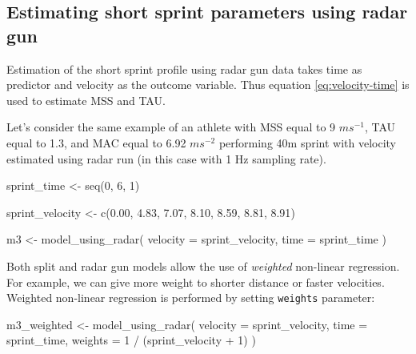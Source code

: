 \documentclass[fleqn,10pt]{wlpeerj} %
\newenvironment{Shaded}{\begin{snugshade}}{\end{snugshade}}
\newcommand{\AttributeTok}[1]{\textcolor[rgb]{0.77,0.63,0.00}{#1}}
\newcommand{\DecValTok}[1]{\textcolor[rgb]{0.00,0.00,0.81}{#1}}
\newcommand{\FloatTok}[1]{\textcolor[rgb]{0.00,0.00,0.81}{#1}}
\newcommand{\FunctionTok}[1]{\textcolor[rgb]{0.00,0.00,0.00}{#1}}
\newcommand{\NormalTok}[1]{#1}
\newcommand{\OtherTok}[1]{\textcolor[rgb]{0.56,0.35,0.01}{#1}}
\newcommand{\SpecialCharTok}[1]{\textcolor[rgb]{0.00,0.00,0.00}{#1}}
\begin{document}
\normalsize

\hypertarget{estimating-short-sprint-parameters-using-radar-gun}{%
\subsection{Estimating short sprint parameters using radar gun}\label{estimating-short-sprint-parameters-using-radar-gun}}

Estimation of the short sprint profile using radar gun data takes time as predictor and velocity as the outcome variable. Thus equation \eqref{eq:velocity-time} is used to estimate MSS and TAU.

Let's consider the same example of an athlete with MSS equal to 9 \(ms^{-1}\), TAU equal to 1.3, and MAC equal to 6.92 \(ms^{-2}\) performing 40m sprint with velocity estimated using radar run (in this case with 1 Hz sampling rate).

\small

\begin{Shaded}
\begin{Highlighting}[]
\NormalTok{sprint\_time }\OtherTok{\textless{}{-}} \FunctionTok{seq}\NormalTok{(}\DecValTok{0}\NormalTok{, }\DecValTok{6}\NormalTok{, }\DecValTok{1}\NormalTok{)}

\NormalTok{sprint\_velocity }\OtherTok{\textless{}{-}} \FunctionTok{c}\NormalTok{(}\FloatTok{0.00}\NormalTok{, }\FloatTok{4.83}\NormalTok{, }\FloatTok{7.07}\NormalTok{, }\FloatTok{8.10}\NormalTok{, }\FloatTok{8.59}\NormalTok{, }\FloatTok{8.81}\NormalTok{, }\FloatTok{8.91}\NormalTok{)}

\NormalTok{m3 }\OtherTok{\textless{}{-}} \FunctionTok{model\_using\_radar}\NormalTok{(}
  \AttributeTok{velocity =}\NormalTok{ sprint\_velocity,}
  \AttributeTok{time =}\NormalTok{ sprint\_time}
\NormalTok{)}
\end{Highlighting}
\end{Shaded}

\normalsize

Both split and radar gun models allow the use of \emph{weighted} non-linear regression. For example, we can give more weight to shorter distance or faster velocities. Weighted non-linear regression is performed by setting \texttt{weights} parameter:

\small

\begin{Shaded}
\begin{Highlighting}[]
\NormalTok{m3\_weighted }\OtherTok{\textless{}{-}} \FunctionTok{model\_using\_radar}\NormalTok{(}
  \AttributeTok{velocity =}\NormalTok{ sprint\_velocity,}
  \AttributeTok{time =}\NormalTok{ sprint\_time,}
  \AttributeTok{weights =} \DecValTok{1} \SpecialCharTok{/}\NormalTok{ (sprint\_velocity }\SpecialCharTok{+} \DecValTok{1}\NormalTok{)}
\NormalTok{)}
\end{Highlighting}
\end{Shaded}
\end{document}
